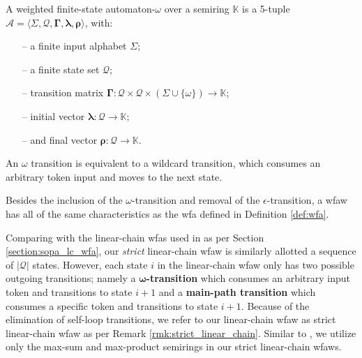 \begin{definition}
  \label{def:wfa_w}
  A weighted finite-state automaton-$\omega$ over a semiring $\mathbb{K}$ is a
  5-tuple $\mathcal{A} = \langle \Sigma, \mathcal{Q}, \bm{\Gamma}, \bm{\lambda}, \bm{\rho}
  \rangle$, with:

  \begin{itemize}
  \itemsep0em
    \item[--] a finite input alphabet $\Sigma$;
    \item[--] a finite state set $\mathcal{Q}$;
    \item[--] transition matrix $\bm{\Gamma}: \mathcal{Q} \times \mathcal{Q} \times (\Sigma \cup \{\omega\}) \rightarrow \mathbb{K}$;
    \item[--] initial vector $\bm{\lambda}: \mathcal{Q} \rightarrow \mathbb{K}$;
    \item[--] and final vector $\bm{\rho}: \mathcal{Q} \rightarrow \mathbb{K}$.
  \end{itemize}

  \begin{remark}
    An $\omega$ transition is equivalent to a wildcard transition, which
    consumes an arbitrary token input and moves to the next state.
  \end{remark}

  \begin{remark}
    Besides the inclusion of the $\omega$-transition and removal of the
    $\epsilon$-transition, a \ac{wfaw} has all of the same characteristics
    as the \ac{wfa} defined in Definition \ref{def:wfa}.
  \end{remark}
\end{definition}

Comparing with the linear-chain \ac{wfas} used in \citet{schwartz2018sopa} as per
Section \ref{section:sopa_lc_wfa}, our \textit{strict} linear-chain \ac{wfaw}
is similarly allotted a sequence of $|\mathcal{Q}|$ states. However, each state
$i$ in the linear-chain \ac{wfaw} only has two possible outgoing transitions;
namely a \textbf{$\bm{\omega}$-transition} which consumes an arbitrary input
token and transitions to state $i+1$ and a \textbf{main-path transition} which
consumes a specific token and transitions to state $i+1$. Because of the
elimination of self-loop transitions, we refer to our linear-chain \ac{wfaw}
as strict linear-chain \ac{wfaw} as per Remark
\ref{rmk:strict_linear_chain}. Similar to \citet{schwartz2018sopa}, we utilize
only the max-sum and max-product semirings in our strict linear-chain
\ac{wfaws}.

